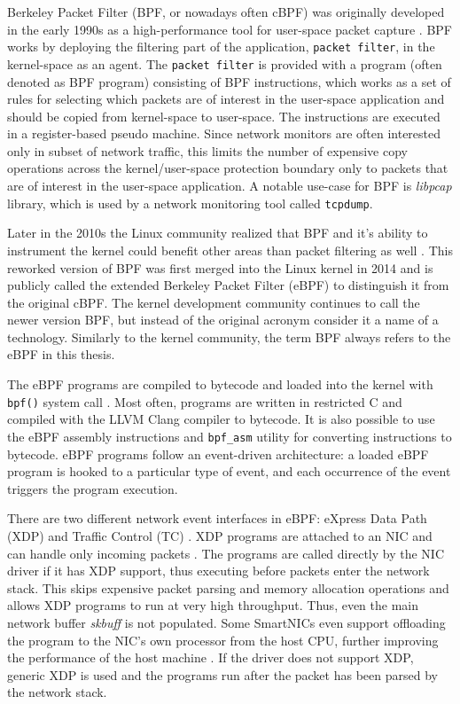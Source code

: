 \documentclass[english, 12pt, a4paper, sci, utf8, a-2b, online]{aaltothesis}
\begin{document}
Berkeley Packet Filter (BPF, or nowadays often cBPF) was originally developed in the early 1990s as a high-performance tool for user-space packet capture \cite{mccanne1993bsd}.
BPF works by deploying the filtering part of the application, \texttt{packet filter}, in the kernel-space as an agent.
The \texttt{packet filter} is provided with a program (often denoted as BPF program) consisting of BPF instructions, which works as a set of rules for selecting which packets are of interest in the user-space application and should be copied from kernel-space to user-space.
The instructions are executed in a register-based pseudo machine.
Since network monitors are often interested only in subset of network traffic, this limits the number of expensive copy operations across the kernel/user-space protection boundary only to packets that are of interest in the user-space application.
A notable use-case for BPF is \emph{libpcap} library, which is used by a network monitoring tool called \texttt{tcpdump}.

Later in the 2010s the Linux community realized that BPF and it's ability to instrument the kernel could benefit other areas than packet filtering as well \cite{vieira2020fast}.
This reworked version of BPF was first merged into the Linux kernel in 2014 and is publicly called the extended Berkeley Packet Filter (eBPF) to distinguish it from the original cBPF.
The kernel development community continues to call the newer version BPF, but instead of the original acronym consider it a name of a technology.
Similarly to the kernel community, the term BPF always refers to the eBPF in this thesis.

The eBPF programs are compiled to bytecode and loaded into the kernel with \texttt{bpf()} system call \cite{miano2021framework}.
Most often, programs are written in restricted C and compiled with the LLVM Clang compiler to bytecode.
It is also possible to use the eBPF assembly instructions and \texttt{bpf\_asm} utility for converting instructions to bytecode.
eBPF programs follow an event-driven architecture: a loaded eBPF program is hooked to a particular type of event, and each occurrence of the event triggers the program execution.

There are two different network event interfaces in eBPF: eXpress Data Path (XDP) and Traffic Control (TC) \cite{miano2021framework}.
XDP programs are attached to an NIC and can handle only incoming packets \cite{hoiland2018express}.
The programs are called directly by the NIC driver if it has XDP support, thus executing before packets enter the network stack.
This skips expensive packet parsing and memory allocation operations and allows XDP programs to run at very high throughput.
Thus, even the main network buffer \emph{skbuff} is not populated.
Some SmartNICs even support offloading the program to the NIC's own processor from the host CPU, further improving the performance of the host machine \cite{cilium-program-types}.
If the driver does not support XDP, generic XDP is used and the programs run after the packet has been parsed by the network stack.
\end{document}
